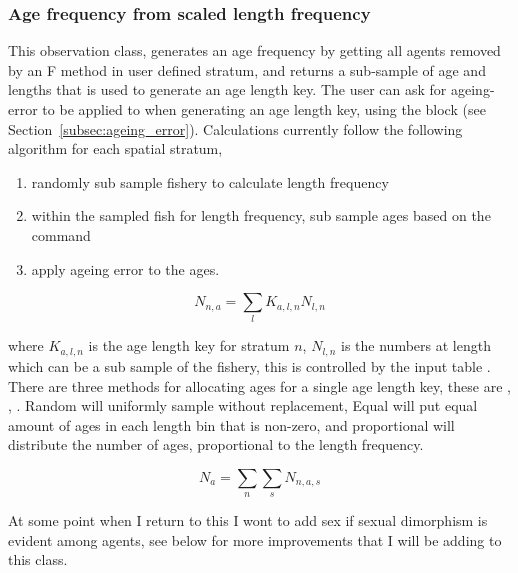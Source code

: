 \subsubsection{Age frequency from scaled length frequency}\label{subsubsec:Mortalitysubsamle}
This observation class, generates an age frequency by getting all agents removed by an F method in user defined stratum, and returns a sub-sample of age and lengths that is used to generate an age length key. The user can ask for ageing-error to be applied to when generating an age length key, using the   block (see Section~\ref{subsec:ageing_error}). Calculations currently follow the following algorithm for each spatial stratum,

\begin{enumerate}
	\item randomly sub sample fishery to calculate length frequency
	\item within the sampled fish for length frequency, sub sample ages based on the  command
	\item apply ageing error to the ages.
\end{enumerate}

\begin{equation}
N_{n,a} = \sum_l K_{a,l,n} N_{l,n}
\end{equation}

where $K_{a,l,n}$ is the age length key for stratum $n$, $N_{l,n}$ is the numbers at length which can be a sub sample of the fishery, this is controlled by the input table . There are three methods for allocating ages for a single age length key, these are , , . Random will uniformly sample without replacement, Equal will put equal amount of ages in each length bin that is non-zero, and proportional will distribute the number of ages, proportional to the length frequency.

\begin{equation}
N_{a} = \sum_n \sum_s N_{n,a,s}
\end{equation}

At some point when I return to this I wont to add sex if sexual dimorphism is evident among agents, see below for more improvements that I will be adding to this class.

